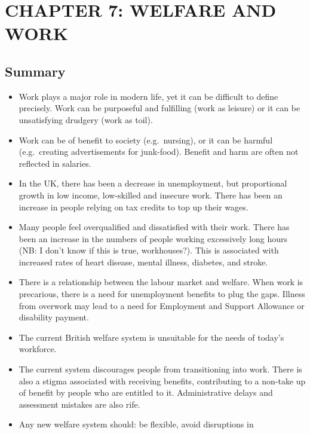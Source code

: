 \documentclass[]{tufte-handout}
\begin{document}
\newpage

\hypertarget{chapter-7-welfare-and-work}{%
\section{CHAPTER 7: WELFARE AND WORK}\label{chapter-7-welfare-and-work}}

\hypertarget{summary-1}{%
\subsection{Summary}\label{summary-1}}

\begin{itemize}
\item
  Work plays a major role in modern life, yet it can be difficult to
  define precisely. Work can be purposeful and fulfilling (work as
  leisure) or it can be unsatisfying drudgery (work as toil).
\item
  Work can be of benefit to society (e.g.~nursing), or it can be harmful
  (e.g.~creating advertisements for junk-food). Benefit and harm are
  often not reflected in salaries.
\item
  In the UK, there has been a decrease in unemployment, but proportional
  growth in low income, low-skilled and insecure work. There has been an
  increase in people relying on tax credits to top up their wages.
\item
  Many people feel overqualified and dissatisfied with their work. There
  has been an increase in the numbers of people working excessively long
  hours (NB: I don't know if this is true, workhouses?). This is
  associated with increased rates of heart disease, mental illness,
  diabetes, and stroke.
\item
  There is a relationship between the labour market and welfare. When
  work is precarious, there is a need for unemployment benefits to plug
  the gaps. Illness from overwork may lead to a need for Employment and
  Support Allowance or disability payment.
\item
  The current British welfare system is unsuitable for the needs of
  today's workforce.
\item
  The current system discourages people from transitioning into work.
  There is also a stigma associated with receiving benefits,
  contributing to a non-take up of benefit by people who are entitled to
  it. Administrative delays and assessment mistakes are also rife.
\item
  Any new welfare system should: be flexible, avoid disruptions in

\end{itemize}
\end{document}
